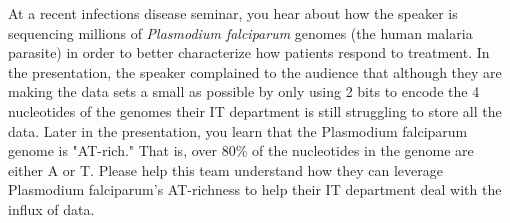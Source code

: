 \documentclass[12pt]{article}
\begin{document}
\renewcommand{\headrulewidth}{0.5pt}

\phantom{Test}

At a recent infections disease seminar, you hear about how the speaker is
sequencing millions of {\sl Plasmodium falciparum} genomes (the human malaria
parasite) in order to better characterize how patients respond to treatment. In
the presentation, the speaker complained to the audience that although they are
making the data sets a small as possible by only using 2 bits to encode the 4
nucleotides of the genomes their IT department is still struggling to store all
the data. Later in the presentation, you learn that the Plasmodium falciparum
genome is "AT-rich." That is, over 80\% of the nucleotides in the genome are
either A or T. Please help this team understand how they can leverage
Plasmodium falciparum’s AT-richness to help their IT department deal with the
influx of data.

\pagebreak
\end{document}
